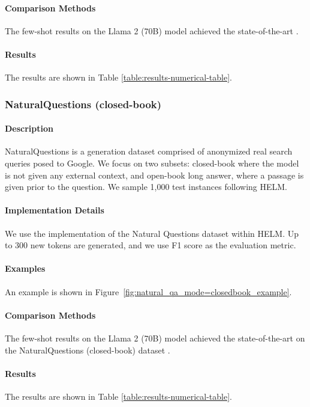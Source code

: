 \paragraph{Comparison Methods}
The few-shot results on the Llama 2 (70B) model achieved the state-of-the-art \citep{liang2022holistic}.

\paragraph{Results} The results are shown in Table \ref{table:results-numerical-table}.

\subsubsection{NaturalQuestions (closed-book)} 
\label{appendix:NaturalQuestions}
\paragraph{Description} NaturalQuestions \citep{kwiatkowski-etal-2019-natural} is a generation dataset comprised of anonymized real search queries posed to Google. We focus on two subsets: closed-book where the model is not given any external context, and open-book long answer, where a passage is given prior to the question. We sample 1,000 test instances following HELM.

\paragraph{Implementation Details}
We use the implementation of the Natural Questions dataset within HELM. Up to 300 new tokens are generated, and we use F1 score as the evaluation metric.

\paragraph{Examples} An example is shown in Figure~\ref{fig:natural_qa_mode=closedbook_example}.

\paragraph{Comparison Methods}
The few-shot results on the Llama 2 (70B) model achieved the state-of-the-art on the NaturalQuestions (closed-book) dataset \citep{liang2022holistic}.

\paragraph{Results} The results are shown in Table \ref{table:results-numerical-table}.

